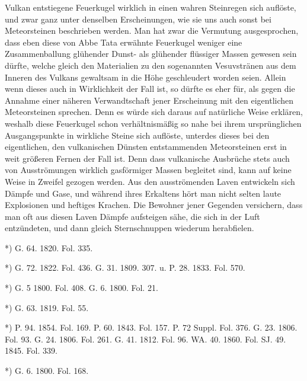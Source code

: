 \documentclass[a4paper, 11pt, oneside, polutonikogreek, german]{article}
\begin{document}
Vulkan entstiegene Feuerkugel wirklich in einen wahren Steinregen sich auflöste, und zwar ganz unter denselben Erscheinungen, wie sie uns auch sonst bei Meteorsteinen beschrieben werden. Man hat zwar die Vermutung ausgesprochen, dass eben diese von Abbe Tata erwähnte Feuerkugel weniger eine Zusammenballung glühender Dunst- als glühender flüssiger Massen gewesen sein dürfte, welche gleich den Materialien zu den sogenannten Vesuvstränen aus dem Inneren des Vulkans gewaltsam in die Höhe geschleudert worden seien. Allein wenn dieses auch in Wirklichkeit der Fall ist, so dürfte es eher für, als gegen die Annahme einer näheren Verwandtschaft jener Erscheinung mit den eigentlichen Meteorsteinen sprechen. Denn es würde sich daraus auf natürliche Weise erklären, weshalb diese Feuerkugel schon verhältnismäßig so nahe bei ihrem ursprünglichen Ausgangspunkte in wirkliche Steine sich auflöste, unterdes dieses bei den eigentlichen, den vulkanischen Dünsten entstammenden Meteorsteinen erst in weit größeren Fernen der Fall ist. Denn dass vulkanische Ausbrüche stets auch von Ausströmungen wirklich gasförmiger Massen begleitet sind, kann auf keine Weise in Zweifel gezogen werden. Aus den ausströmenden Laven entwickeln sich Dämpfe und Gase, und während ihres Erkaltens hört man nicht selten laute Explosionen und heftiges Krachen. Die Bewohner jener Gegenden versichern, dass man oft aus diesen Laven Dämpfe aufsteigen sähe, die sich in der Luft entzündeten, und dann gleich Sternschnuppen wiederum herabfielen.

*) G. 64. 1820. Fol. 335.

*) G. 72. 1822. Fol. 436. G. 31. 1809. 307. u. P. 28. 1833. Fol. 570.

*) G. 5 1800. Fol. 408. G. 6. 1800. Fol. 21.

*) G. 63. 1819. Fol. 55.

*) P. 94. 1854. Fol. 169. P. 60. 1843. Fol. 157. P. 72 Suppl. Fol. 376. G. 23. 1806. Fol. 93. G. 24. 1806. Fol. 261. G. 41. 1812. Fol. 96. WA. 40. 1860. Fol. SJ. 49. 1845. Fol. 339.

*) G. 6. 1800. Fol. 168.
\end{document}
